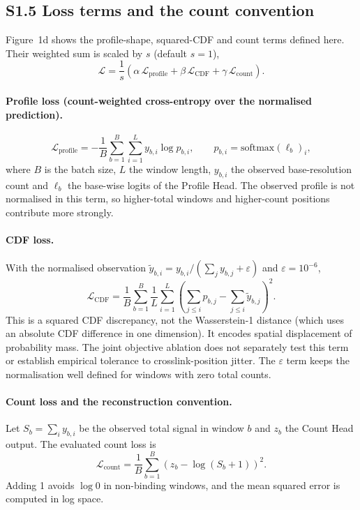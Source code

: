 \documentclass[11pt]{article}
\begin{document}
\subsection*{S1.5 Loss terms and the count convention}

Figure~1d shows the profile-shape, squared-CDF and count terms defined here. Their weighted sum is scaled by $s$ (default $s=1$),
\begin{equation}
\mathcal{L} = \frac{1}{s}\left(\alpha\,\mathcal{L}_{\mathrm{profile}} + \beta\,\mathcal{L}_{\mathrm{CDF}} + \gamma\,\mathcal{L}_{\mathrm{count}}\right).
\end{equation}

\paragraph{Profile loss (count-weighted cross-entropy over the normalised prediction).}
\begin{equation}
\mathcal{L}_{\mathrm{profile}} = -\frac{1}{B} \sum_{b=1}^{B} \sum_{i=1}^{L} y_{b,i} \log p_{b,i},
\qquad
p_{b,i} = \mathrm{softmax}(\boldsymbol{\ell}_b)_i,
\end{equation}
where $B$ is the batch size, $L$ the window length, $y_{b,i}$ the observed base-resolution count and $\boldsymbol{\ell}_b$ the base-wise logits of the Profile Head. The observed profile is not normalised in this term, so higher-total windows and higher-count positions contribute more strongly.

\paragraph{CDF loss.} With the normalised observation $\tilde{y}_{b,i} = y_{b,i}/(\sum_j y_{b,j} + \varepsilon)$ and $\varepsilon = 10^{-6}$,
\begin{equation}
\mathcal{L}_{\mathrm{CDF}} = \frac{1}{B} \sum_{b=1}^{B} \frac{1}{L} \sum_{i=1}^{L} \left( \sum_{j \le i} p_{b,j} - \sum_{j \le i} \tilde{y}_{b,j} \right)^{2}.
\end{equation}
This is a squared CDF discrepancy, not the Wasserstein-1 distance (which uses an absolute CDF difference in one dimension). It encodes spatial displacement of probability mass. The joint objective ablation does not separately test this term or establish empirical tolerance to crosslink-position jitter. The $\varepsilon$ term keeps the normalisation well defined for windows with zero total counts.

\paragraph{Count loss and the reconstruction convention.} Let $S_b = \sum_i y_{b,i}$ be the observed total signal in window $b$ and $z_b$ the Count Head output. The evaluated count loss is
\begin{equation}
\mathcal{L}_{\mathrm{count}} = \frac{1}{B} \sum_{b=1}^{B} \left( z_b - \log(S_b + 1) \right)^{2}.
\label{eq:countloss}
\end{equation}
Adding 1 avoids $\log 0$ in non-binding windows, and the mean squared error is computed in log space.
\end{document}
